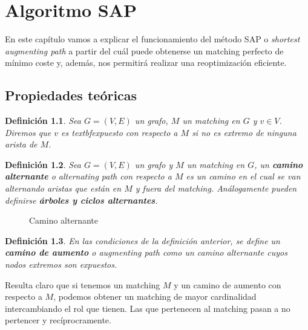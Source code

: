 \documentclass[twoside,a4paper,openright,12pt]{book}
\newtheorem{defi}{Definici\'on}[section]
\begin{document}
\chapter{Algoritmo SAP}
En este capítulo vamos a explicar el funcionamiento del método SAP o \textit{shortest augmenting path} a partir del cuál puede obtenerse un matching perfecto de mínimo coste y, además, nos permitirá realizar una reoptimización eficiente.
\section{Propiedades teóricas}
\begin{defi}
Sea $G=(V,E)$ un grafo, $M$ un matching en $G$ y $v\in V$. Diremos que $v$ es textbf{expuesto} con respecto a $M$ si no es extremo de ninguna arista de $M$.
\end{defi}
\begin{defi}
Sea $G=(V,E)$ un grafo y $M$ un matching en $G$, un \textbf{camino alternante} o \textit{alternating path} con respecto a $M$ es un camino en el cual se van alternando aristas que están en $M$ y fuera del matching. Análogamente pueden definirse \textbf{árboles y ciclos alternantes}.
\end{defi}
\begin{figure}[h!]
\centering
{}
\caption{Camino alternante}
\end{figure}

\begin{defi}
En las condiciones de la definición anterior, se define un \textbf{camino de aumento} o \textit{augmenting path} como un camino alternante cuyos nodos extremos son expuestos.
\end{defi}
Resulta claro que si tenemos un matching $M$ y un camino de aumento con respecto a $M$, podemos obtener un matching de mayor cardinalidad intercambiando el rol que tienen. Las que pertenecen al matching pasan a no pertencer y recíprocramente.
\end{document}
